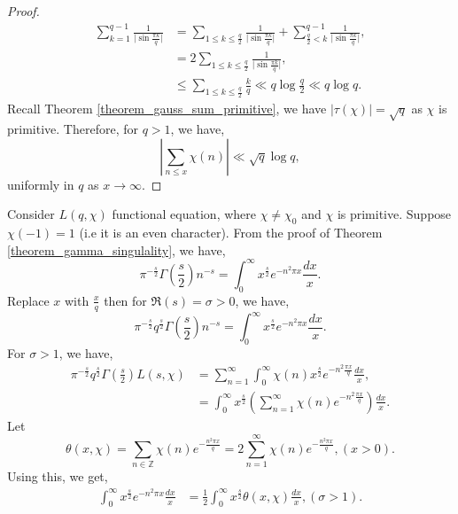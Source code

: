 \documentclass{article}
\newcommand{\Z}[0]{\mathbb{Z}}
\begin{document}
\begin{proof}
  \begin{align*}
    \sum_{k=1}^{q-1}{\frac 1 {\vert\sin{\frac {\pi k} q}\vert}} & = \sum_{1\leq k\leq{\frac q 2}}{\frac 1 {\vert\sin{\frac {\pi k} q}\vert}}+\sum_{{\frac q 2}<k}^{q-1}{\frac 1 {\vert\sin{\frac {\pi k} q}\vert}},\\
    & = 2\sum_{1\leq k\leq{\frac q 2}}{\frac 1 {\vert\sin{\frac {\pi k} q}\vert}},\\
    &\leq \sum_{1\leq k\leq{\frac q 2}}{\frac k q} \ll  q\log{\frac q 2}\ll q\log q.
  \end{align*}
  Recall Theorem \ref{theorem_gauss_sum_primitive}, we have $\vert\tau(\chi)\vert=\sqrt{q}$ as $\chi$ is primitive. Therefore, for $q>1$, we have,
  \begin{equation*}
    \left\vert\sum_{n\leq x}\chi(n)\right\vert\ll \sqrt{q}\log q,
  \end{equation*}
  uniformly in $q$ as $x\to\infty$.
\end{proof}
Consider $L(q,\chi)$ functional equation, where $\chi\not=\chi_0$ and $\chi$ is primitive. Suppose $\chi(-1)=1$ (i.e it is an even character).
From the proof of Theorem \ref{theorem_gamma_singulality}, we have,
\begin{equation*}
  \pi^{-{\frac s 2}}\Gamma\left({\frac s 2}\right)n^{-s} = \int_0^\infty x^{{\frac s 2}}e^{-n^2\pi x}{\frac {dx} x}.
\end{equation*}
Replace $x$ with ${\frac x q}$ then for $\Re(s)=\sigma>0$, we have,
\begin{equation*}
  \pi^{-{\frac s 2}}q^{{\frac s 2}}\Gamma\left({\frac s 2}\right)n^{-s} = \int_0^\infty x^{{\frac s 2}}e^{-n^2\pi x}{\frac {dx} x}.
\end{equation*}
For $\sigma>1$, we have,
\begin{align*}
  \pi^{-{\frac s 2}}q^{{\frac s 2}}\Gamma\left({\frac s 2}\right)L(s,\chi)& = \sum_{n=1}^\infty\int_0^\infty \chi(n)x^{{\frac s 2}}e^{-n^2{\frac {\pi x} q}}{\frac {dx} x},\\
  & = \int_0^\infty x^{{\frac s 2}}\left(\sum_{n=1}^\infty \chi(n)e^{-n^2{\frac {\pi x} q}}\right){\frac {dx} x}.
\end{align*}
Let 
\begin{equation*}
  \theta(x,\chi)  = \sum_{n\in\Z}\chi(n)e^{-{\frac {n^2\pi x} q}} = 2\sum_{n=1}^\infty\chi(n)e^{-{\frac {n^2\pi x} q}},(x>0).
\end{equation*}
Using this, we get,
\begin{align*}
  \int_0^\infty x^{{\frac s 2}}e^{-n^2\pi x}{\frac {dx} x} & = {\frac 1 2}\int_0^\infty x^{{\frac s 2}}\theta(x,\chi){\frac {dx} x}, (\sigma>1).
\end{align*}
\end{document}
